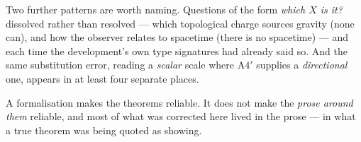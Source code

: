 \documentclass[11pt,a4paper]{article}
\theoremstyle{definition}
\theoremstyle{remark}
\newcommand{\Afour}{\ensuremath{\mathrm{A4}'}}
\begin{document}
Two further patterns are worth naming. Questions of the form \emph{which $X$ is
it?} dissolved rather than resolved --- which topological charge sources gravity
(none can), and how the observer relates to spacetime (there is no spacetime) ---
and each time the development's own type signatures had already said so. And the
same substitution error, reading a \emph{scalar} scale where \Afour{} supplies a
\emph{directional} one, appears in at least four separate places.

\begin{claimbox}
A formalisation makes the theorems reliable. It does not make the \emph{prose
around them} reliable, and most of what was corrected here lived in the prose ---
in what a true theorem was being quoted as showing.
\end{claimbox}
\end{document}
